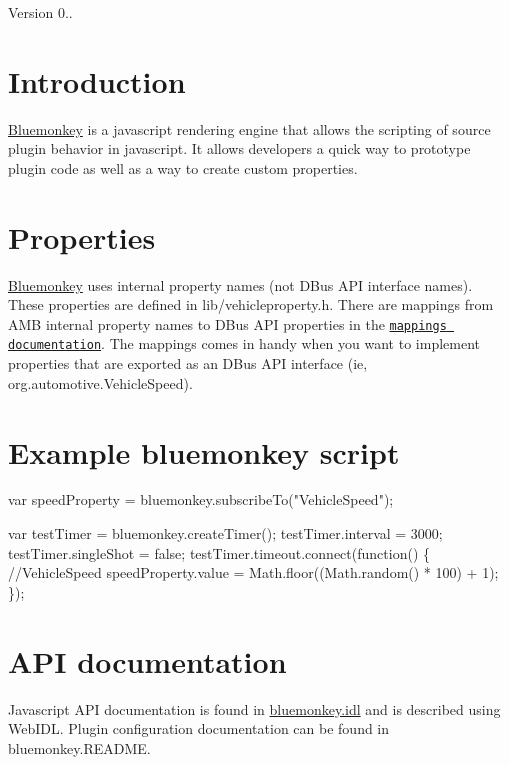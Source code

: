 \begin{DoxyVersion}{Version}
0.. 
\end{DoxyVersion}
\hypertarget{index_intro}{}\section{Introduction}\label{index_intro}
\hyperlink{interfaceBluemonkey}{Bluemonkey} is a javascript rendering engine that allows the scripting of source plugin behavior in javascript. It allows developers a quick way to prototype plugin code as well as a way to create custom properties. \hypertarget{index_properties}{}\section{Properties}\label{index_properties}
\hyperlink{interfaceBluemonkey}{Bluemonkey} uses internal property names (not D\+Bus A\+P\+I interface names). These properties are defined in lib/vehicleproperty.\+h. There are mappings from A\+M\+B internal property names to D\+Bus A\+P\+I properties in the \href{ambdbusmappings_8idl}{\tt mappings documentation}. The mappings comes in handy when you want to implement properties that are exported as an D\+Bus A\+P\+I interface (ie, org.\+automotive.\+Vehicle\+Speed). \hypertarget{index_example}{}\section{Example bluemonkey script}\label{index_example}

\begin{DoxyCode}
var speedProperty = bluemonkey.subscribeTo(\textcolor{stringliteral}{"VehicleSpeed"});

var testTimer = bluemonkey.createTimer();
testTimer.interval = 3000;
testTimer.singleShot = \textcolor{keyword}{false};
testTimer.timeout.connect(\textcolor{keyword}{function}() \{
  \textcolor{comment}{//VehicleSpeed}
  speedProperty.value = Math.floor((Math.random() * 100) + 1);
\});
\end{DoxyCode}
 \hypertarget{index_Javascript}{}\section{A\+P\+I documentation}\label{index_Javascript}
Javascript A\+P\+I documentation is found in \hyperlink{bluemonkey_8idl_source}{bluemonkey.\+idl} and is described using Web\+I\+D\+L. Plugin configuration documentation can be found in bluemonkey.\+R\+E\+A\+D\+M\+E. 